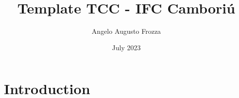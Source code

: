 \documentclass{article}
\title{Template TCC - IFC Camboriú}
\author{Angelo Augusto Frozza}
\date{July 2023}
\begin{document}
\maketitle

\section{Introduction}
\end{document}
